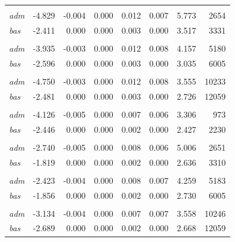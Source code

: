 \documentclass[a4paper,11pt]{article}
\begin{document}
\begin{longtable}[t]{lrrrrrrr}
\addlinespace[0.3em]
\multicolumn{8}{l}{\textbf{AGRSPI3}}\\
\hspace{1em}\textit{adm} & -4.829 & -0.004 & 0.000 & 0.012 & 0.007 & 5.773 & 2654\\
\hspace{1em}\textit{bas} & -2.411 & 0.000 & 0.000 & 0.003 & 0.000 & 3.517 & 3331\\
\addlinespace[0.3em]
\multicolumn{8}{l}{\textbf{AGRSPI6}}\\
\hspace{1em}\textit{adm} & -3.935 & -0.003 & 0.000 & 0.012 & 0.008 & 4.157 & 5180\\
\hspace{1em}\textit{bas} & -2.596 & 0.000 & 0.000 & 0.003 & 0.000 & 3.035 & 6005\\
\addlinespace[0.3em]
\multicolumn{8}{l}{\textbf{AGRSPI12}}\\
\hspace{1em}\textit{adm} & -4.750 & -0.003 & 0.000 & 0.012 & 0.008 & 3.555 & 10233\\
\hspace{1em}\textit{bas} & -2.481 & 0.000 & 0.000 & 0.003 & 0.000 & 2.726 & 12059\\
\addlinespace[0.3em]
\multicolumn{8}{l}{\textbf{AGRSPEI1}}\\
\hspace{1em}\textit{adm} & -4.126 & -0.005 & 0.000 & 0.007 & 0.006 & 3.306 & 973\\
\hspace{1em}\textit{bas} & -2.446 & 0.000 & 0.000 & 0.002 & 0.000 & 2.427 & 2230\\
\addlinespace[0.3em]
\multicolumn{8}{l}{\textbf{AGRSPEI3}}\\
\hspace{1em}\textit{adm} & -2.740 & -0.005 & 0.000 & 0.008 & 0.006 & 5.006 & 2651\\
\hspace{1em}\textit{bas} & -1.819 & 0.000 & 0.000 & 0.002 & 0.000 & 2.636 & 3310\\
\addlinespace[0.3em]
\multicolumn{8}{l}{\textbf{AGRSPEI6}}\\
\hspace{1em}\textit{adm} & -2.423 & -0.004 & 0.000 & 0.008 & 0.007 & 4.259 & 5183\\
\hspace{1em}\textit{bas} & -1.856 & 0.000 & 0.000 & 0.002 & 0.000 & 2.730 & 6005\\
\addlinespace[0.3em]
\multicolumn{8}{l}{\textbf{AGRSPEI12}}\\
\hspace{1em}\textit{adm} & -3.134 & -0.004 & 0.000 & 0.007 & 0.007 & 3.558 & 10246\\
\hspace{1em}\textit{bas} & -2.689 & 0.000 & 0.000 & 0.002 & 0.000 & 2.668 & 12059\\*
\end{longtable}
\endgroup{}
\end{document}

